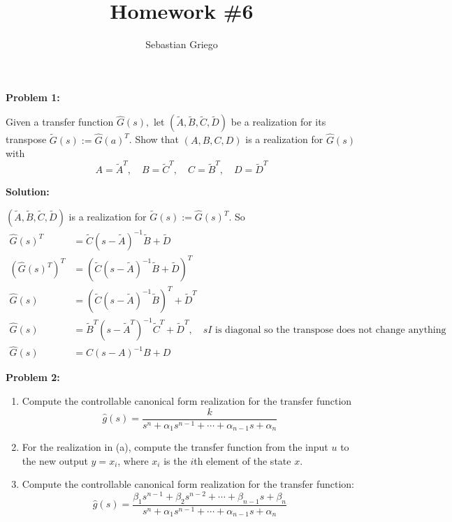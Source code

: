 \documentclass[12pt]{article}
\newenvironment{problem}[1]{
    \textbf{Problem #1:}
}{
    \rmfamily \vspace{1em}
}
\newenvironment{solution}{
    \textbf{Solution:}
    
}{
    
    \vspace{2em}
}
\begin{document}
\title{Homework \#6}  %
\author{Sebastian Griego}  %
\maketitle


\begin{problem}{1}
    Given a transfer function \(\hat{G}(s),\) let \((\tilde{A}, \tilde{B}, \tilde{C}, \tilde{D})\) be a realization
    for its transpose \(\tilde{G}(s) := \hat{G}(a)^T\). Show that \((A, B, C, D)\) is a realization for \(\hat{G}(s)\) with
    \[
        A = \tilde{A}^T, \quad B = \tilde{C}^T, \quad C = \tilde{B}^T, \quad D = \tilde{D}^T
    \]
\end{problem}

\begin{solution}
    \((\tilde{A}, \tilde{B}, \tilde{C}, \tilde{D})\) is a realization for \(\tilde{G}(s) := \hat{G}(s)^T\). So
    \[
        \begin{aligned}
            \hat{G}(s)^T &= \tilde{C}(s - \tilde{A})^{-1}\tilde{B} + \tilde{D} \\
            (\hat{G}(s)^T)^T &= (\tilde{C}(s - \tilde{A})^{-1}\tilde{B} + \tilde{D})^T \\
            \hat{G}(s) &= (\tilde{C}(s - \tilde{A})^{-1}\tilde{B})^T + \tilde{D}^T \\
            \hat{G}(s) &= \tilde{B}^T(s - \tilde{A}^T)^{-1}\tilde{C}^T + \tilde{D}^T, \quad sI\text{ is diagonal so the transpose does not change anything} \\
            \hat{G}(s) &= C(s - A)^{-1}B + D
        \end{aligned}
    \]
    
\end{solution}

\newpage

\begin{problem}{2}
    \begin{enumerate}[label=(\alph*)]
        \item Compute the controllable canonical form realization for the transfer function
        \[
            \hat{g}(s) = \frac{k}{s^n + \alpha_1s^{n-1} + \cdots + \alpha_{n-1}s + \alpha_n}
        \]
        \item For the realization in (a), compute the transfer function from the input \(u\) to the new output \(y = x_i\), where \(x_i\) is the \(i\)th element of the state \(x\).
        \item  Compute the controllable canonical form realization for the transfer function:
        \[
            \hat{g}(s) = \frac{\beta_1s^{n-1} + \beta_2s^{n-2} + \cdots + \beta_{n-1}s + \beta_n}{s^n + \alpha_1s^{n-1} + \cdots + \alpha_{n-1}s + \alpha_n}
        \]
    \end{enumerate}
\end{problem}
\end{document}
